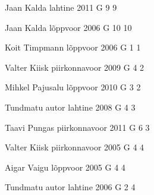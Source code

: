 \documentclass[11pt]{article}
\begin{document}
{Jaan Kalda} %
{lahtine} %
{2011} %
{G 9} %
{9} %
{

\ifEngHint
\fi
}

{Jaan Kalda} %
{lõppvoor} %
{2006} %
{G 10} %
{10} %
{

\ifEngHint
\fi
}

{Koit Timpmann} %
{lõppvoor} %
{2006} %
{G 1} %
{1} %
{

\ifEngHint
\fi
}

{Valter Kiisk} %
{piirkonnavoor} %
{2009} %
{G 4} %
{2} %
{

\ifEngHint
\fi
}

{Mihkel Pajusalu} %
{lõppvoor} %
{2010} %
{G 3} %
{2} %
{

\ifEngHint
\fi
}

{Tundmatu autor} %
{lahtine} %
{2008} %
{G 4} %
{3} %
{

\ifEngHint
\fi
}

{Taavi Pungas} %
{piirkonnavoor} %
{2011} %
{G 6} %
{3} %
{

\ifEngHint
\fi
}

{Valter Kiisk} %
{piirkonnavoor} %
{2005} %
{G 4} %
{4} %
{

\ifEngHint
\fi
}

{Aigar Vaigu} %
{lõppvoor} %
{2005} %
{G 4} %
{4} %
{

\ifEngHint
\fi
}

{Tundmatu autor} %
{lahtine} %
{2006} %
{G 2} %
{4} %
{

\ifEngHint
\fi
}
\end{document}
